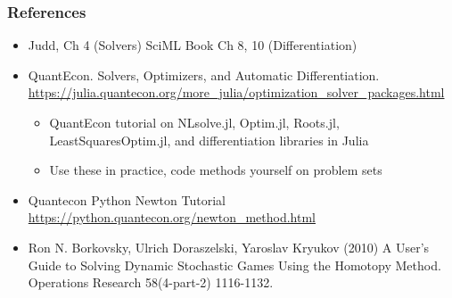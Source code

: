 \documentclass[bigger]{beamer}
\begin{document}
\begin{frame}%

\frametitle{References}

\begin{itemize}

\item Judd, Ch 4 (Solvers) SciML Book Ch 8, 10 (Differentiation)

\item QuantEcon. Solvers, Optimizers, and Automatic Differentiation. \url{https://julia.quantecon.org/more_julia/optimization_solver_packages.html}  
\begin{itemize}
\item QuantEcon tutorial on NLsolve.jl, Optim.jl, Roots.jl, LeastSquaresOptim.jl, and differentiation libraries in Julia
\item Use these in practice, code methods yourself on problem sets

\end{itemize}

\item Quantecon Python Newton Tutorial \url{https://python.quantecon.org/newton_method.html}

\item Ron N. Borkovsky, Ulrich Doraszelski, Yaroslav Kryukov (2010) A User's Guide to Solving Dynamic Stochastic Games Using the Homotopy Method. Operations Research 58(4-part-2) 1116-1132.

\end{itemize}


\end{frame}%
\end{document}
